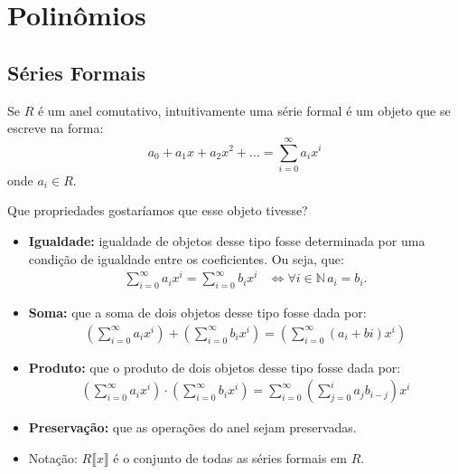 
\chapter{Polinômios}

\section{Séries Formais}
Se $R$ é um anel comutativo, intuitivamente uma série formal é um objeto que se escreve na forma:
$$a_0+a_1x+a_2x^2+\dots=\sum_{i=0}^\infty a_ix^i$$
onde $a_i\in R$.

Que propriedades gostaríamos que esse objeto tivesse?

\begin{itemize}
    \item \textbf{Igualdade:} igualdade de objetos desse tipo fosse determinada por uma condição de igualdade entre os coeficientes. Ou seja, que:
    \begin{align*}
      \sum_{i=0}^\infty a_ix^i=\sum_{i=0}^\infty b_ix^i & \Leftrightarrow \forall i\in \mathbb N\, a_i=b_i.
    \end{align*}
    \item \textbf{Soma:} que a soma de dois objetos desse tipo fosse dada por:
    \begin{align*}
        \left(\sum_{i=0}^\infty a_ix^i\right)+\left(\sum_{i=0}^\infty b_ix^i\right)=\left(\sum_{i=0}^\infty (a_i+bi)x^i\right)
    \end{align*}
    \item \textbf{Produto:} que o produto de dois objetos desse tipo fosse dada por:
    \begin{align*}
        \left(\sum_{i=0}^\infty a_ix^i\right)\cdot\left(\sum_{i=0}^\infty b_ix^i\right)=\sum_{i=0}^\infty \left(\sum_{j=0}^i a_{j}b_{i-j}\right)x^i
    \end{align*}
    \item \textbf{Preservação:} que as operações do anel sejam preservadas.
    \item Notação: $R\llbracket x \rrbracket$ é o conjunto de todas as séries formais em $R$.
\end{itemize}

